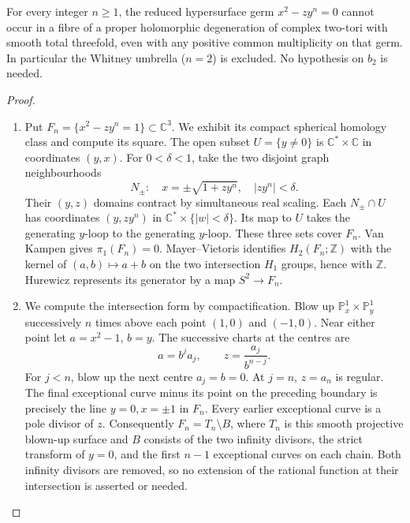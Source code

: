 \begin{proposition}[P4.16]\hypertarget{tag-02WN}{}\label{night:P4.16}\label{stmt:P4.16}

For every integer $n\geq1$, the reduced hypersurface germ
$x^2-zy^n=0$ cannot occur in a fibre of a proper holomorphic
degeneration of complex two-tori with smooth total threefold,
even with any positive common multiplicity on that germ.
In particular the Whitney umbrella ($n=2$) is excluded.
No hypothesis on $b_2$ is needed.
\end{proposition}
\begin{proof}

\begin{enumerate}[label={$\langle1\rangle$\arabic*.},leftmargin=*]
\item Put $F_n=\{x^2-zy^n=1\}\subset\mathbb C^3$. We exhibit its
compact spherical homology class and compute its square.
The open subset $U=\{y\ne0\}$ is
$\mathbb C^*\times\mathbb C$ in coordinates $(y,x)$.
For $0<\delta<1$, take the two disjoint graph neighbourhoods
\[
 N_\pm:\quad x=\pm\sqrt{1+zy^n},\quad |zy^n|<\delta.
\]
Their $(y,z)$ domains contract by simultaneous real scaling.
Each $N_\pm\cap U$ has coordinates $(y,zy^n)$ in
$\mathbb C^*\times\{|w|<\delta\}$. Its map to $U$ takes
the generating $y$-loop to the generating $y$-loop. These three
sets cover $F_n$. Van Kampen gives $\pi_1(F_n)=0$.
Mayer--Vietoris identifies $H_2(F_n;\mathbb Z)$ with the
kernel of $(a,b)\mapsto a+b$ on the two intersection
$H_1$ groups, hence with $\mathbb Z$. Hurewicz represents its
generator by a map $S^2\to F_n$.

\item We compute the intersection form by compactification. Blow up
$\mathbb P^1_x\times\mathbb P^1_y$ successively $n$ times above
each point $(1,0)$ and $(-1,0)$. Near either point let
$a=x^2-1$, $b=y$. The successive charts at the centres are
\[
 a=b^j a_j,\qquad z=\frac{a_j}{b^{n-j}}.
\]
For $j<n$, blow up the next centre $a_j=b=0$.
At $j=n$, $z=a_n$ is regular. The final exceptional curve
minus its point on the preceding boundary is precisely the
line $y=0,x=\pm1$ in $F_n$. Every earlier exceptional curve
is a pole divisor of $z$. Consequently $F_n=T_n\setminus B$,
where $T_n$ is this smooth projective blown-up surface and
$B$ consists of the two infinity divisors, the strict transform
of $y=0$, and the first $n-1$ exceptional curves on each chain.
Both infinity divisors are removed, so no extension of the
rational function at their intersection is asserted or needed.


\end{enumerate}
\end{proof}
